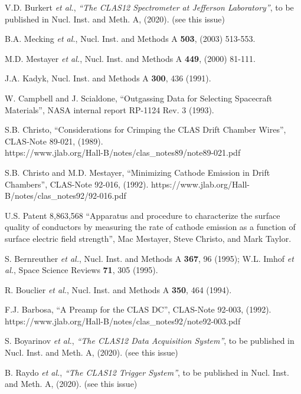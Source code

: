 \begin{thebibliography}{99}

V.D. Burkert {\it et al.}, {\it ``The CLAS12 Spectrometer at Jefferson Laboratory''}, to be published in
Nucl. Inst. and Meth. A, (2020). (see this issue)

B.A. Mecking {\it et al.}, Nucl. Inst. and Methods A {\bf 503}, (2003) 513-553.

M.D. Mestayer {\it et al.}, Nucl. Inst. and Methods A {\bf 449}, (2000) 81-111.

J.A. Kadyk, Nucl. Inst. and Methods A {\bf 300}, 436 (1991).

W. Campbell and J. Scialdone, ``Outgassing Data for Selecting Spacecraft Materials'', NASA internal
report RP-1124 Rev. 3 (1993).

S.B. Christo, ``Considerations for Crimping the CLAS Drift Chamber Wires'', CLAS-Note
89-021, (1989). \\ https://www.jlab.org/Hall-B/notes/clas\_notes89/note89-021.pdf

S.B. Christo and M.D. Mestayer, ``Minimizing Cathode Emission in Drift Chambers'', CLAS-Note 92-016,
(1992). https://www.jlab.org/Hall-B/notes/clas\_notes92/92-016.pdf

U.S. Patent 8,863,568 ``Apparatus and procedure to characterize the surface quality 
of conductors by measuring the rate of cathode emission as a function of surface electric field 
strength'', Mac Mestayer, Steve Christo, and Mark Taylor.

S. Bernreuther {\it et al.}, Nucl. Inst. and Methods A {\bf 367}, 96 (1995); W.L. Imhof {\it et al.},
Space Science Reviews {\bf 71}, 305 (1995).

R. Bouclier {\it et al.}, Nucl. Inst. and Methods A {\bf 350}, 464 (1994).

F.J. Barbosa, ``A Preamp for the CLAS DC'', CLAS-Note 92-003, (1992).
https://www.jlab.org/Hall-B/notes/clas\_notes92/note92-003.pdf

S. Boyarinov {\it et al.}, {\it ``The CLAS12 Data Acquisition System''}, to be published in Nucl. Inst.
and Meth. A, (2020). (see this issue)

B. Raydo {\it et al.}, {\it ``The CLAS12 Trigger System''}, to be published in Nucl. Inst. and Meth. A, (2020).
(see this issue)


\end{thebibliography}
